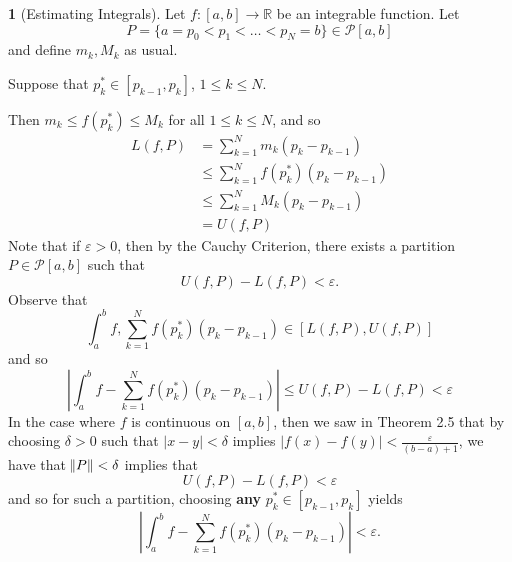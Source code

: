 \documentclass[11pt]{article}
\theoremstyle{definition}
\newtheorem{none}[thm]{}
\newcommand{\mbR}{\ensuremath{\mathbb{R}}}
\begin{document}
\begin{none}[Estimating Integrals]
Let $f : [a, b] \to \mbR$ be an integrable function. 
Let $$P = \{a = p_0 < p_1 < \dots < p_N = b\} \in \mathcal{P}[a, b]$$ and define $m_k, M_k$ as usual. 

Suppose that $p_k^* \in [p_{k-1}, p_k]$, $1 \leq k \leq N$. 

Then $m_k \leq f(p_k^*) \leq M_k$ for all $1 \leq k \leq N$, and so
\begin{align*}
L(f, P) & = \sum_{k=1}^N m_k (p_k - p_{k-1}) \\
& \leq \sum_{k=1}^N f(p_k^*) (p_k - p_{k-1}) \\
& \leq \sum_{k=1}^N M_k (p_k - p_{k-1}) \\
& = U(f, P)
\end{align*}
Note that if $\varepsilon > 0$, then by the Cauchy Criterion, there exists a partition $P \in \mathcal{P}[a, b]$ such that $$U(f, P) - L(f, P) < \varepsilon \text{.}$$
Observe that $$\int_a^b f, \sum_{k=1}^N f(p_k^*)(p_k - p_{k-1}) \in [L(f, P), U(f, P)]$$
and so
$$\left|\int_a^b f - \sum_{k=1}^N f(p_k^*)(p_k - p_{k-1})\right| \leq U(f, P) - L(f, P) < \varepsilon$$
In the case where $f$ is continuous on $[a, b]$, then we saw in Theorem 2.5 that by choosing $\delta > 0$ such that $|x - y| < \delta$ implies $|f(x) - f(y)| < \frac{\varepsilon}{(b-a) + 1}$, we have that $\norm{P} < \delta$ implies that
$$U(f, P) - L(f, P) < \varepsilon$$
and so for such a partition, choosing \textbf{any} $p_k^* \in [p_{k-1}, p_k]$ yields
$$\left|\int_a^b f - \sum_{k=1}^N f(p_k^*)(p_k - p_{k-1})\right| < \varepsilon \text{.}$$
\end{none}
\end{document}
